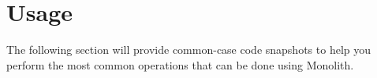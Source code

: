 \section{Usage}
The following section will provide common-case code snapshots to help you perform the most common operations that can be done using Monolith.





\newpage